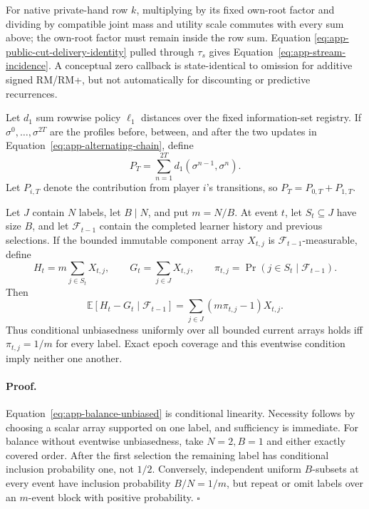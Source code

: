 For native private-hand row $k$, multiplying by its fixed own-root factor and
dividing by compatible joint mass and utility scale commutes with every sum
above; the own-root factor must remain inside the row sum.  Equation
\ref{eq:app-public-cut-delivery-identity} pulled through $\tau_s$ gives
Equation~\ref{eq:app-stream-incidence}.  A conceptual zero callback is
state-identical to omission for additive signed RM/RM+, but not automatically
for discounting or predictive recurrences.

Let $d_1$ sum rowwise policy $\ell_1$ distances over the fixed information-set
registry.  If $\sigma^0,\ldots,\sigma^{2T}$ are the profiles before, between,
and after the two updates in Equation~\ref{eq:app-alternating-chain}, define
\begin{equation}
P_T=\sum_{n=1}^{2T}d_1(\sigma^{n-1},\sigma^n).
\label{eq:app-projective-path}
\end{equation}
Let $P_{i,T}$ denote the contribution from player $i$'s transitions, so
$P_T=P_{0,T}+P_{1,T}$.

\begin{proposition}
\label{app:balance-vs-unbiasedness}
Let $J$ contain $N$ labels, let $B\mid N$, and put $m=N/B$.  At event $t$,
let $S_t\subseteq J$ have size $B$, and let $\mathcal F_{t-1}$ contain the
completed learner history and previous selections.  If the bounded immutable
component array $X_{t,j}$ is $\mathcal F_{t-1}$-measurable, define
\[
H_t=m\sum_{j\in S_t}X_{t,j},\qquad
G_t=\sum_{j\in J}X_{t,j},\qquad
\pi_{t,j}=\Pr(j\in S_t\mid\mathcal F_{t-1}).
\]
Then
\begin{equation}
\mathbb E[H_t-G_t\mid\mathcal F_{t-1}]
=\sum_{j\in J}(m\pi_{t,j}-1)X_{t,j}.
\label{eq:app-balance-unbiased}
\end{equation}
Thus conditional unbiasedness uniformly over all bounded current arrays holds
iff $\pi_{t,j}=1/m$ for every label.  Exact epoch coverage and this eventwise
condition imply neither one another.
\end{proposition}

\paragraph{Proof.}
Equation~\ref{eq:app-balance-unbiased} is conditional linearity.  Necessity
follows by choosing a scalar array supported on one label, and sufficiency is
immediate.  For balance without eventwise unbiasedness, take $N=2,B=1$ and
either exactly covered order.  After the first selection the remaining label
has conditional inclusion probability one, not $1/2$.  Conversely, independent
uniform $B$-subsets at every event have inclusion probability $B/N=1/m$, but
repeat or omit labels over an $m$-event block with positive probability.
\hfill$\square$

